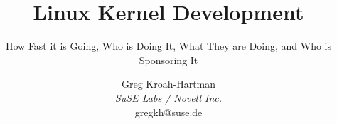 \documentclass[final]{ols}
\begin{document}

\title{Linux Kernel Development}
\subtitle{How Fast it is Going, Who is Doing It, What They are Doing, and Who is Sponsoring It}
\date{}             %


\author{%
Greg Kroah-Hartman \\
{\itshape SuSE Labs / Novell Inc.}\\
{\ttfamily\normalsize gregkh@suse.de}\\
} %

\maketitle

%
% 
% 
% 
% 
% 
% 
% 
% 
% 
\end{document}
